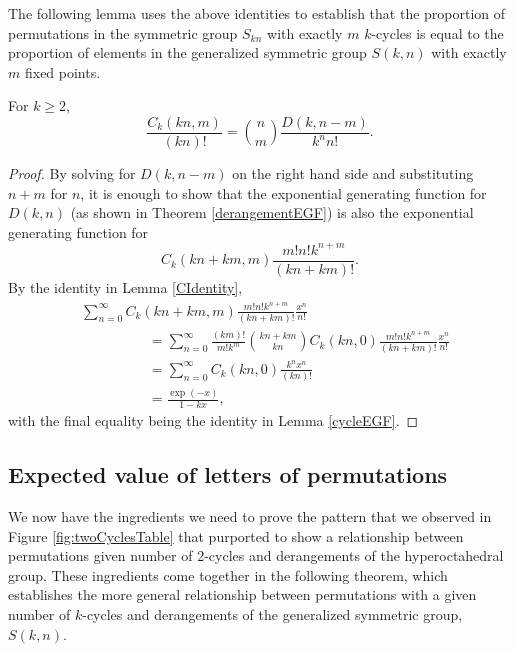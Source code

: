 The following lemma uses the above identities to establish that
the proportion of permutations in the symmetric group $S_{kn}$
with exactly $m$ $k$-cycles is equal to
the proportion of elements in the generalized symmetric group $S(k,n)$
with exactly $m$ fixed points.
\begin{lemma}
  \label{lem:fixedPointsAndCycles}
  For $k \geq 2$,
 \begin{equation}
    \frac{C_k(kn, m)}{(kn)!} = \binom nm\frac{D(k, n - m)}{k^nn!}.
    \label{eq:fixedPointsAndCycles}
  \end{equation}
\end{lemma}
\begin{proof}
  By solving for $D(k,n-m)$ on the right hand side and substituting $n + m$ for $n$, it is
  enough to show that the exponential generating function for $D(k,n)$
  (as shown in Theorem \ref{derangementEGF}) is also
  the exponential generating function for \begin{equation}
    C_k(kn+km, m) \frac{m!n!k^{n+m}}{(kn + km)!}.
  \end{equation}
  By the identity in Lemma \ref{CIdentity},
  \begin{align}
    &\sum_{n=0}^\infty C_k(kn+km, m) \frac{m!n!k^{n+m}}{(kn + km)!}\frac{x^n}{n!} \\
    &\hspace{2cm} = \sum_{n=0}^\infty \frac{(km)!}{m!k^m}\binom{kn + km}{kn}C_k(kn, 0) \frac{m!n!k^{n+m}}{(kn + km)!}\frac{x^n}{n!} \\
    &\hspace{2cm} = \sum_{n=0}^\infty C_k(kn, 0)\frac{k^nx^n}{(kn)!} \\
    &\hspace{2cm} = \frac{\exp(-x)}{1-kx},
  \end{align}
  with the final equality being the identity in Lemma \ref{cycleEGF}.
\end{proof}

\subsection{Expected value of letters of permutations}
We now have the ingredients we need to prove the pattern that we observed in
Figure \ref{fig:twoCyclesTable} that purported to show a relationship between
permutations given number of $2$-cycles and derangements of the hyperoctahedral
group. These ingredients come together in the following theorem, which
establishes the more general relationship between permutations with a given
number of $k$-cycles and derangements of the generalized symmetric
group, $S(k,n)$.

